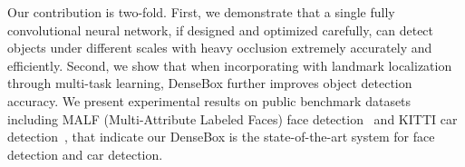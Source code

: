 Our contribution is two-fold. First, we demonstrate that a single fully convolutional neural network, if designed and optimized carefully, can detect objects under different scales with heavy occlusion extremely accurately and efficiently. Second, we show that when incorporating with landmark localization through multi-task learning, DenseBox further improves object detection accuracy. We present experimental results on public benchmark datasets including MALF (Multi-Attribute Labeled Faces) face detection~\cite{faceevaluation15} and KITTI car detection~\cite{Geiger2012CVPR}, that indicate our DenseBox is the state-of-the-art system for face detection and car detection.


